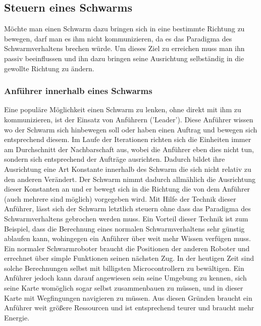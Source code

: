 
\subsection{Steuern eines Schwarms}\label{subsec:SchwarmSteuern}

Möchte man einen Schwarm dazu bringen sich in eine bestimmte Richtung zu bewegen, darf man es ihm nicht kommunizieren, da es das Paradigma des Schwarmverhaltens brechen würde.
Um dieses Ziel zu erreichen muss man ihn passiv beeinflussen und ihn dazu bringen seine Ausrichtung selbständig in die gewollte Richtung zu ändern.

\subsubsection*{Anführer innerhalb eines Schwarms}\label{subsubsec:Anführer}
Eine populäre Möglichkeit einen Schwarm zu lenken, ohne direkt mit ihm zu kommunizieren, ist der Einsatz von Anführern ('Leader').
Diese Anführer wissen wo der Schwarm sich hinbewegen soll oder haben einen Auftrag und bewegen sich entsprechend diesem.
Im Laufe der Iterationen richten sich die Einheiten immer am Durchschnitt der Nachbarschaft aus, wobei die Anführer eben dies nicht tun, sondern sich entsprechend der Aufträge ausrichten.
Dadurch bildet ihre Ausrichtung eine Art Konstante innerhalb des Schwarm die sich nicht relativ zu den anderen Verändert.
Der Schwarm nimmt dadurch allmählich die Ausrichtung dieser Konstanten an und er bewegt sich in die Richtung die von dem Anführer (auch mehrere sind möglich) vorgegeben wird.
Mit Hilfe der Technik dieser Anführer, lässt sich der Schwarm letztlich steuern ohne dass das Paradigma des Schwarmverhaltens gebrochen werden muss.
Ein Vorteil dieser Technik ist zum Beispiel, dass die Berechnung eines normalen Schwarmverhaltens sehr günstig ablaufen kann, wohingegen ein Anführer über weit mehr Wissen verfügen muss. Ein normaler Schwarmroboter braucht die Positionen der anderen Roboter und errechnet über simple Funktionen seinen nächsten Zug. In der heutigen Zeit sind solche Berechnungen selbst mit billigsten Microcontrollern zu bewältigen. Ein Anführer jedoch kann darauf angewiesen sein seine Umgebung zu kennen, sich seine Karte womöglich sogar selbst zusammenbauen zu müssen, und in dieser Karte mit Wegfingungen navigieren zu müssen. Aus diesen Gründen braucht ein Anführer weit größere Ressourcen und ist entsprechend teurer und braucht mehr Energie.

